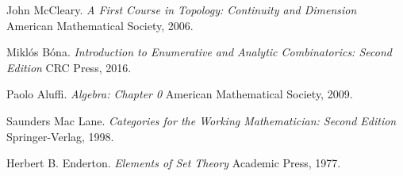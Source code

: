 \newpage

\begin{thebibliography}{9}

John McCleary.
\textit{A First Course in Topology: Continuity and Dimension}
American Mathematical Society, 2006.

Mikl\'os B\'ona.
\textit{Introduction to Enumerative and Analytic Combinatorics: Second Edition}
CRC Press, 2016.

Paolo Aluffi.
\textit{Algebra: Chapter 0}
American Mathematical Society, 2009.

Saunders Mac Lane.
\textit{Categories for the Working Mathematician: Second Edition}
Springer-Verlag, 1998.

Herbert B. Enderton.
\textit{Elements of Set Theory}
Academic Press, 1977.
\end{thebibliography}